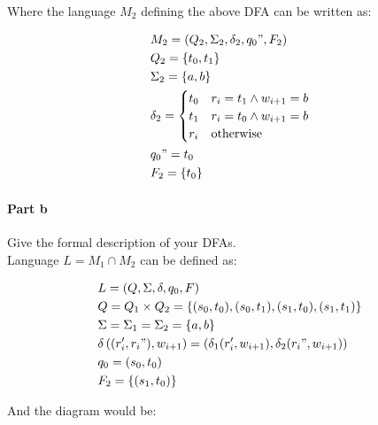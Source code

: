 \documentclass{article}
\begin{document}
Where the language $M_2$ defining the above DFA can be written as:

\begin{align*}
& M_2=\left( Q_2, \Sigma_2, \delta_2, q_0", F_2 \right) \\
& Q_2=\{ t_0, t_1 \} \\
& \Sigma_2=\{ a, b \} \\
& \delta_2=\begin{cases}
    t_0 &r_i=t_1 \wedge w_{i+1}=b \\
    t_1 &r_i=t_0 \wedge w_{i+1}=b \\
    r_i &\textrm{otherwise}
\end{cases} \\
& q_0"=t_0 \\
& F_2=\{ t_0 \}
\end{align*}

\paragraph{Part b} Give the formal description of your DFAs.\\

Language $L=M_1\cap{}M_2$ can be defined as:

\begin{align*}
& L=\left( Q, \Sigma, \delta, q_0, F \right) \\
& Q= Q_1 \times Q_2 = \{ (s_0,t_0),(s_0,t_1),(s_1,t_0),(s_1,t_1) \} \\
& \Sigma{}=\Sigma_1=\Sigma_2=\{ a, b \} \\
& \delta\left( (r_i',r_i"), w_{i+1} \right)=\left( \delta_1(r_i',w_{i+1}), \delta_2(r_i", w_{i+1}) \right) \\
& q_0=(s_0,t_0) \\
& F_2=\{ (s_1,t_0) \}
\end{align*}

And the diagram would be:


\begin{center}
\end{center}
\end{document}
